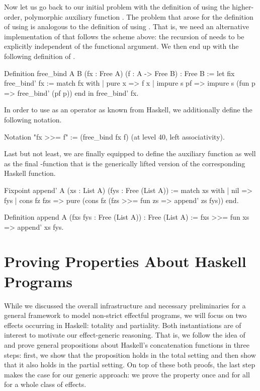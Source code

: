 Now let us go back to our initial problem with the definition of  using the higher\--order, polymorphic auxiliary function .
The problem that arose for the definition of  using  is analogous to the definition of  using .
That is, we need an alternative implementation of  that follows the scheme above: the recursion of  needs to be explicitly independent of the functional argument.
We then end up with the following definition of .

\begin{coqcode}
Definition free_bind A B (fx : Free A) (f : A -> Free B) : Free B :=
 let fix free_bind' fx :=
     match fx with
     | pure x      => f x
     | impure s pf => impure s (fun p => free_bind' (pf p))
     end
 in free_bind' fx.
\end{coqcode}

In order to use  as an operator \cinl{(>>=)} as known from Haskell, we additionally define the following notation.

\begin{coqcode}
Notation "fx >>= f" := (free_bind fx f) (at level 40, left associativity).
\end{coqcode}

Last but not least, we are finally equipped to define the auxiliary function  as well as the final \--function that is the generically lifted version of the corresponding Haskell function.

\begin{coqcode}
Fixpoint append' A (xs : List A) (fys : Free (List A)) :=
  match xs with
  | nil => fys
  | cons fz fzs => pure (cons fz (fzs >>= fun zs => append' zs fys))
  end.

Definition append A (fxs fys : Free (List A)) : Free (List A) :=
  fxs >>= fun xs => append' xs fys.
\end{coqcode}

\section{Proving Properties About Haskell Programs}

While we discussed the overall infrastructure and necessary preliminaries for a general framework to model non\--strict effectful
programs, we will focus on two effects occurring in Haskell: totality and partiality.
Both instantiations are of interest to motivate our effect\--generic reasoning.
That is, we follow the idea of \citet{abel2005verifying} and prove general propositions about Haskell's concatenation functions in three steps: first, we show that the proposition holds in the total setting and then show that it also holds in the partial setting.
On top of these both proofs, the last step makes the case for our generic approach: we prove the property once and for all for a whole class of effects.

